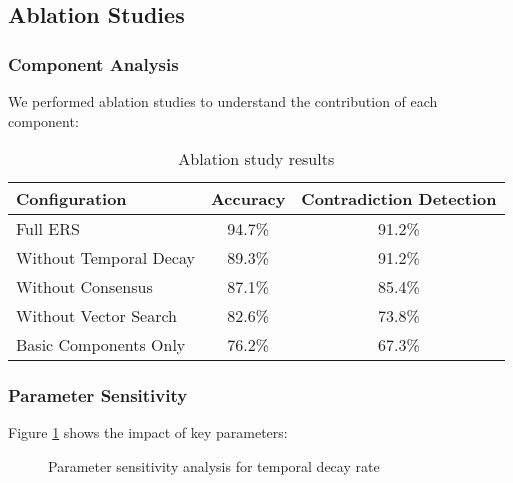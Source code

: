 \documentclass[12pt,a4paper]{article}
\begin{document}
\subsection{Ablation Studies}

\subsubsection{Component Analysis}

We performed ablation studies to understand the contribution of each component:

\begin{table}[h]
\centering
\begin{tabular}{@{}lcc@{}}
\toprule
\textbf{Configuration} & \textbf{Accuracy} & \textbf{Contradiction Detection} \\
\midrule
Full ERS & 94.7\% & 91.2\% \\
Without Temporal Decay & 89.3\% & 91.2\% \\
Without Consensus & 87.1\% & 85.4\% \\
Without Vector Search & 82.6\% & 73.8\% \\
Basic Components Only & 76.2\% & 67.3\% \\
\bottomrule
\end{tabular}
\caption{Ablation study results}
\label{tab:ablation_results}
\end{table}

\subsubsection{Parameter Sensitivity}

Figure \ref{fig:parameter_sensitivity} shows the impact of key parameters:

\begin{figure}[h]
\centering
{}
\caption{Parameter sensitivity analysis for temporal decay rate}
\label{fig:parameter_sensitivity}
\end{figure}
\end{document}
